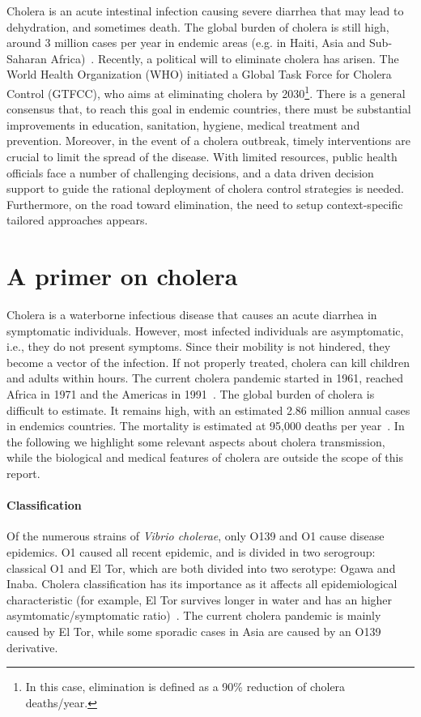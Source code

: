 Cholera is an acute intestinal infection causing severe diarrhea that may lead to dehydration, and sometimes death. The global burden of cholera is still high, around 3 million cases per year in endemic areas (e.g. in Haiti, Asia and Sub-Saharan Africa)~\cite{ali_updated_2015}. 
Recently, a political will to eliminate cholera has arisen. The World Health Organization (WHO) initiated a Global Task Force for Cholera Control (GTFCC), who aims at eliminating cholera by 2030\footnote{In this case, elimination is defined as a 90\% reduction of cholera deaths/year.}. There is a general consensus that, to reach this goal in endemic countries, there must be substantial improvements in education, sanitation, hygiene, medical treatment and prevention. Moreover, in the event of a cholera outbreak, timely interventions are crucial to limit the spread of the disease. With limited resources, public health officials face a number of challenging decisions, and a data driven decision support to guide the rational deployment of cholera control strategies is needed. Furthermore, on the road toward elimination, the need to setup context-specific tailored approaches appears. 

\section{A primer on cholera} 

Cholera is a waterborne infectious disease that causes an acute diarrhea in symptomatic individuals. However, most infected individuals are asymptomatic, i.e., they do not present symptoms. Since their mobility is not hindered, they become a vector of the infection. If not properly treated, cholera can kill children and adults within hours. The current cholera pandemic started in 1961, reached Africa in 1971 and the Americas in 1991~\cite{mutreja_evidence_2011}. The global burden of cholera is difficult to estimate. It remains high, with an estimated 2.86 million annual cases in endemics countries. The mortality is estimated at 95,000 deaths per year~\cite{ali_updated_2015}. In the following we highlight some relevant aspects about cholera transmission, while the biological and medical features of cholera are outside the scope of this report. 

\paragraph{Classification} Of the numerous strains of \emph{Vibrio cholerae}, only O139 and O1 cause disease epidemics. O1 caused all recent epidemic, and is divided in two serogroup: classical O1 and El Tor, which are both divided into two serotype: Ogawa and Inaba. Cholera classification has its importance as it affects all epidemiological characteristic (for example, El Tor survives longer in water and has an higher asymtomatic/symptomatic ratio)~\cite{who_cholera_2017}. The current cholera pandemic is mainly caused by El Tor, while some sporadic cases in Asia are caused by an O139 derivative. 

